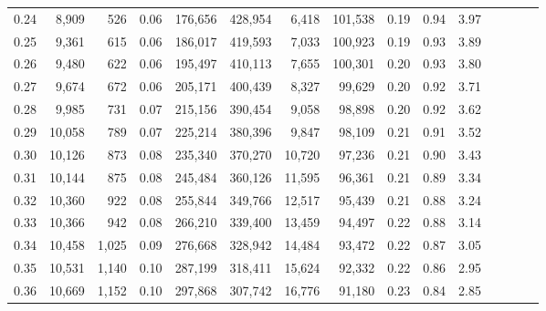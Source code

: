 \begin{tabular}{rrrcrrrrrrrrrrr}
0.24 &   8,909 &    526 &                                       0.06 &  176,656 &  428,954 &    6,418 &  101,538 &  0.19 &  0.94 &                         3.97 \\
0.25 &   9,361 &    615 &                                       0.06 &  186,017 &  419,593 &    7,033 &  100,923 &  0.19 &  0.93 &                         3.89 \\
0.26 &   9,480 &    622 &                                       0.06 &  195,497 &  410,113 &    7,655 &  100,301 &  0.20 &  0.93 &                         3.80 \\
0.27 &   9,674 &    672 &                                       0.06 &  205,171 &  400,439 &    8,327 &   99,629 &  0.20 &  0.92 &                         3.71 \\
0.28 &   9,985 &    731 &                                       0.07 &  215,156 &  390,454 &    9,058 &   98,898 &  0.20 &  0.92 &                         3.62 \\
0.29 &  10,058 &    789 &                                       0.07 &  225,214 &  380,396 &    9,847 &   98,109 &  0.21 &  0.91 &                         3.52 \\
0.30 &  10,126 &    873 &                                       0.08 &  235,340 &  370,270 &   10,720 &   97,236 &  0.21 &  0.90 &                         3.43 \\
0.31 &  10,144 &    875 &                                       0.08 &  245,484 &  360,126 &   11,595 &   96,361 &  0.21 &  0.89 &                         3.34 \\
0.32 &  10,360 &    922 &                                       0.08 &  255,844 &  349,766 &   12,517 &   95,439 &  0.21 &  0.88 &                         3.24 \\
0.33 &  10,366 &    942 &                                       0.08 &  266,210 &  339,400 &   13,459 &   94,497 &  0.22 &  0.88 &                         3.14 \\
0.34 &  10,458 &  1,025 &                                       0.09 &  276,668 &  328,942 &   14,484 &   93,472 &  0.22 &  0.87 &                         3.05 \\
0.35 &  10,531 &  1,140 &                                       0.10 &  287,199 &  318,411 &   15,624 &   92,332 &  0.22 &  0.86 &                         2.95 \\
0.36 &  10,669 &  1,152 &                                       0.10 &  297,868 &  307,742 &   16,776 &   91,180 &  0.23 &  0.84 &                         2.85 \\

\end{tabular}
